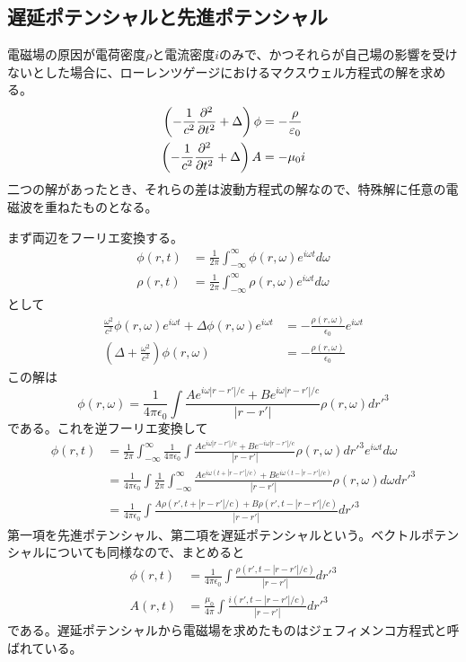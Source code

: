\subsection{遅延ポテンシャルと先進ポテンシャル}
    電磁場の原因が電荷密度$\rho$と電流密度$i$のみで、かつそれらが自己場の影響を受けないとした場合に、ローレンツゲージにおけるマクスウェル方程式の解を求める。
    \begin{align*}
        \left(-\frac{1}{c^2}\pdv[2]{t} + \Delta\right)\phi &= -\frac{\rho}{\varepsilon_0}\\
        \left(-\frac{1}{c^2}\pdv[2]{t} + \Delta\right)A &= -\mu_0 i
    \end{align*}
    二つの解があったとき、それらの差は波動方程式の解なので、特殊解に任意の電磁波を重ねたものとなる。

    まず両辺をフーリエ変換する。
    \begin{align*}
        \phi(r, t) &= \frac{1}{2\pi}\int_{-\infty}^{\infty} \phi(r, \omega)e^{i\omega t}d\omega\\
        \rho(r, t) &= \frac{1}{2\pi}\int_{-\infty}^{\infty} \rho(r, \omega)e^{i\omega t}d\omega
    \end{align*}
    として
    \begin{align*}
        \frac{\omega^2}{c^2}\phi(r, \omega)e^{i\omega t} + \Delta \phi(r, \omega)e^{i\omega t} &= -\frac{\rho(r, \omega)}{\epsilon_0}e^{i\omega t}\\
        \left(\Delta + \frac{\omega^2}{c^2}\right)\phi(r, \omega) &= -\frac{\rho(r, \omega)}{\epsilon_0}
    \end{align*}
    この解は
        \[\phi(r, \omega) = \frac{1}{4\pi\epsilon_0}\int \frac{Ae^{i\omega|r - r'|/c} + Be^{i\omega|r - r'|/c}}{|r - r'|}\rho(r, \omega)dr'^3\]
    である。これを逆フーリエ変換して
    \begin{align*}
        \phi(r, t)
        &= \frac{1}{2\pi}\int_{-\infty}^{\infty} \frac{1}{4\pi\epsilon_0}\int \frac{Ae^{i\omega|r - r'|/c} + Be^{-i\omega|r - r'|/c}}{|r - r'|}\rho(r, \omega)dr'^3 e^{i\omega t}d\omega\\
        &= \frac{1}{4\pi\epsilon_0}\int \frac{1}{2\pi}\int_{-\infty}^{\infty} \frac{Ae^{i\omega(t + |r - r'|/c)} + Be^{i\omega(t - |r - r'|/c)}}{|r - r'|}\rho(r, \omega) d\omega dr'^3\\
        &= \frac{1}{4\pi\epsilon_0}\int \frac{A\rho(r', t + |r - r'|/c) + B\rho(r', t - |r - r'|/c)}{|r - r'|} dr'^3
    \end{align*}
    第一項を先進ポテンシャル、第二項を遅延ポテンシャルという。ベクトルポテンシャルについても同様なので、まとめると
    \begin{align*}
        \phi(r, t) &= \frac{1}{4\pi\epsilon_0}\int \frac{\rho(r', t - |r - r'|/c)}{|r - r'|} dr'^3\\
        A(r, t) &= \frac{\mu_0}{4\pi}\int \frac{i(r', t - |r - r'|/c)}{|r - r'|} dr'^3
    \end{align*}
    である。遅延ポテンシャルから電磁場を求めたものはジェフィメンコ方程式と呼ばれている。

